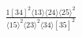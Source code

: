 \documentclass[varwidth, border=5pt]{standalone}
\begin{document}
\begin{my}
$\begin{gathered}
\scriptscriptstyle\frac{1[34]^2⟨13⟩⟨24⟩⟨25⟩^2}{⟨15⟩^2⟨23⟩^2⟨34⟩[35]^2}
\end{gathered}$
\end{my}
\end{document}
